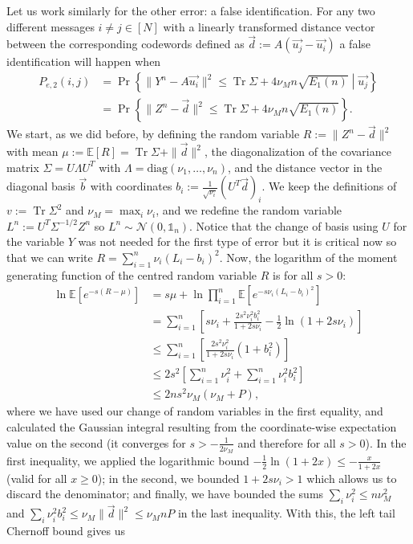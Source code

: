 \documentclass[10pt,conference]{IEEEtran}
\newcommand{\1}{\mathds{1}}
\DeclareMathOperator{\Tr}{Tr}
\newcommand{\EE}{\mathbb{E}}
\newcommand{\cN}{\mathcal{N}}
\begin{document}
Let us work similarly for the other error: a false identification. For any two different messages $i\neq j\in[N]$ with a linearly transformed distance vector between the corresponding codewords defined as $\vec{d}:=A(\vec{u_j}-\vec{u_i})$ a false identification will happen when
\begin{align}
P_{e,2}(i,j)\!&=\! \Pr\left\{\|Y^n-A\vec{u_i}\|^2\!\leq\!\Tr\Sigma+4\nu_Mn\sqrt{E_1(n)}\middle|\vec{u_j}\right\} \nonumber\\
&=\!\Pr\left\{\|Z^n-\vec{d}\|^2\!\leq\!\Tr\Sigma+4\nu_Mn\sqrt{E_1(n)}\right\}.\label{eq:Pe2}
\end{align}
We start, as we did before, by defining the random variable $R:=\|Z^n-\vec{d}\|^2$ with mean $\mu:=\EE[R]=\Tr\Sigma+\|\vec{d}\|^2$, the diagonalization of the covariance matrix $\Sigma=U\Lambda U^T$ with $\Lambda=\text{diag}(\nu_1,\dots,\nu_n)$, and the distance vector in the diagonal basis $\vec{b}$ with coordinates $b_i:=\frac{1}{\sqrt{\nu_i}}(U^T\vec{d})_i$. We keep the definitions of $v:=\Tr \Sigma^2$ and $\nu_M=\max_i\nu_i$, and we redefine the random variable $L^n:=U^T\Sigma^{-1/2}Z^n$ so $L^n\sim\cN(0,\1_n)$. 
Notice that the change of basis using $U$ for the variable $Y$ was not needed for the first type of error but it is critical now so that we can write $R=\sum_{i=1}^n\nu_i(L_i-b_i)^2$. Now, the logarithm of the moment generating function of the centred random variable $R$ is for all $s>0$:
\[
\begin{split}
\ln\EE[e^{-s(R-\mu)}]&=s\mu+\ln\prod_{i=1}^n\EE[e^{-s\nu_i(L_i-b_i)^2}]\\
&=\sum_{i=1}^n\left[s\nu_i+\frac{2s^2\nu_i^2b_i^2}{1+2s\nu_i}-\frac12\ln(1+2s\nu_i)\right]\\
&\leq\sum_{i=1}^n\left[\frac{2s^2\nu_i^2}{1+2s\nu_i}(1+b_i^2)\right]\\
&\leq2s^2\left[\sum_{i=1}^n\nu_i^2+\sum_{i=1}^n\nu_i^2b_i^2\right]\\
&\leq 2ns^2\nu_M\left(\nu_M+P\right),
\end{split}
\]
where we have used our change of random variables in the first equality, and calculated the Gaussian integral resulting from the coordinate-wise expectation value on the second (it converges for $s>-\frac{1}{2\nu_M}$ and therefore for all $s>0$). 
In the first inequality, we applied the logarithmic bound $-\frac12\ln(1+2x)\leq-\frac{x}{1+2x}$ (valid for all $x\geq0$); in the second, we bounded $1+2s\nu_i>1$ which allows us to discard the denominator; and finally, we have bounded the sums $\sum_i\nu_i^2\leq n\nu_M^2$ and $\sum_i\nu_i^2b_i^2\leq\nu_M\|\vec{d}\|^2\leq\nu_MnP$ in the last inequality. With this, the left tail Chernoff bound gives us
\end{document}
